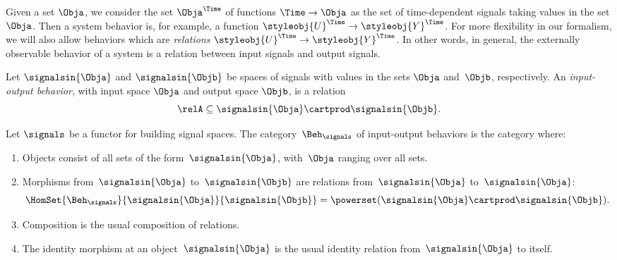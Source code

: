 
   

    Given a set $\Obja$, we consider the set $\Obja^\Time$ of functions $\Time \to \Obja$ as the set of time-dependent signals taking values in the set $\Obja$.
    Then a system behavior is, for example, a function $\styleobj{U}^\Time \to \styleobj{Y}^\Time$.
    For more flexibility in our formalism, we will also allow behaviors which are \emph{relations} $\styleobj{U}^\Time \to \styleobj{Y}^\Time$.
    In other words, in general, the externally observable behavior of a system is a relation between input signals and output signals.

    \begin{definition}
        Let $\signalsin{\Obja}$ and $\signalsin{\Objb}$ be spaces of signals with values in the sets $\Obja$ and~$\Objb$, respectively. 
        An \emph{input-output behavior}, with input space $\Obja$ and output space $\Objb$, is a relation
        \begin{equation*}
            \relA \subseteq \signalsin{\Obja} \cartprod \signalsin{\Objb}.
        \end{equation*}
    \end{definition}

    \begin{definition}
        Let $\signals$ be a functor for building signal spaces. 
        The category~$\Beh_\signals$ of input-output behaviors is the category where:
        \begin{enumerate}
            \item Objects consist of all sets of the form~$\signalsin{\Obja}$, with~$\Obja$ ranging over all sets.
            \item Morphisms from~$\signalsin{\Obja}$ to~$\signalsin{\Objb}$ are relations from~$\signalsin{\Obja}$ to~$\signalsin{\Obja}$:
                  \begin{equation}
                      \HomSet{\Beh_\signals}{\signalsin{\Obja}}{\signalsin{\Objb}} = \powerset (\signalsin{\Obja} \cartprod \signalsin{\Objb}).
                  \end{equation}
            \item Composition is the usual composition of relations.
            \item The identity morphism at an object~$\signalsin{\Obja}$ is the usual identity relation from~$\signalsin{\Obja}$ to itself.
        \end{enumerate}
    \end{definition}

